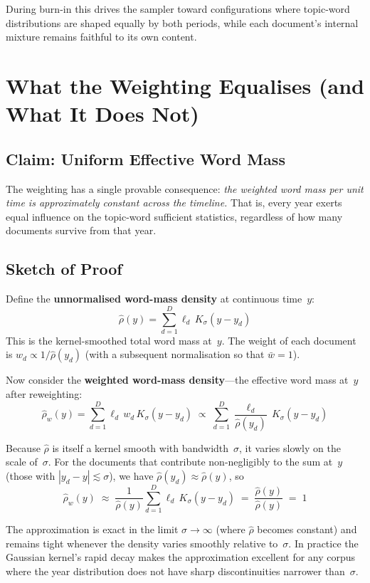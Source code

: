 \documentclass[11pt]{article}
\begin{document}
During burn-in this drives the sampler toward configurations where topic-word distributions are shaped equally by both periods, while each document's internal mixture remains faithful to its own content.

\section{What the Weighting Equalises (and What It Does Not)}

\subsection{Claim: Uniform Effective Word Mass}

The weighting has a single provable consequence:
\emph{the weighted word mass per unit time is approximately constant across the timeline.}
That is, every year exerts equal influence on the topic-word sufficient statistics, regardless of how many documents survive from that year.

\subsection{Sketch of Proof}

Define the \textbf{unnormalised word-mass density} at continuous time~$y$:
\[
\hat\rho(y) = \sum_{d=1}^{D} \ell_d \, K_\sigma(y - y_d)
\]
This is the kernel-smoothed total word mass at~$y$.
The weight of each document is $w_d \propto 1/\hat\rho(y_d)$ (with a subsequent normalisation so that $\bar w = 1$).

Now consider the \textbf{weighted word-mass density}---the effective word mass at~$y$ after reweighting:
\[
\hat\rho_w(y)
  = \sum_{d=1}^{D} \ell_d \, w_d \, K_\sigma(y - y_d)
  \;\propto\; \sum_{d=1}^{D} \frac{\ell_d}{\hat\rho(y_d)}\, K_\sigma(y - y_d)
\]

Because $\hat\rho$ is itself a kernel smooth with bandwidth~$\sigma$, it varies slowly on the scale of~$\sigma$.
For the documents that contribute non-negligibly to the sum at~$y$ (those with $|y_d - y| \lesssim \sigma$), we have $\hat\rho(y_d) \approx \hat\rho(y)$, so
\[
\hat\rho_w(y)
  \;\approx\; \frac{1}{\hat\rho(y)} \sum_{d=1}^{D} \ell_d \, K_\sigma(y - y_d)
  \;=\; \frac{\hat\rho(y)}{\hat\rho(y)}
  \;=\; 1
\]

The approximation is exact in the limit $\sigma \to \infty$ (where $\hat\rho$ becomes constant) and remains tight whenever the density varies smoothly relative to~$\sigma$.
In practice the Gaussian kernel's rapid decay makes the approximation excellent for any corpus where the year distribution does not have sharp discontinuities narrower than~$\sigma$.
\end{document}
